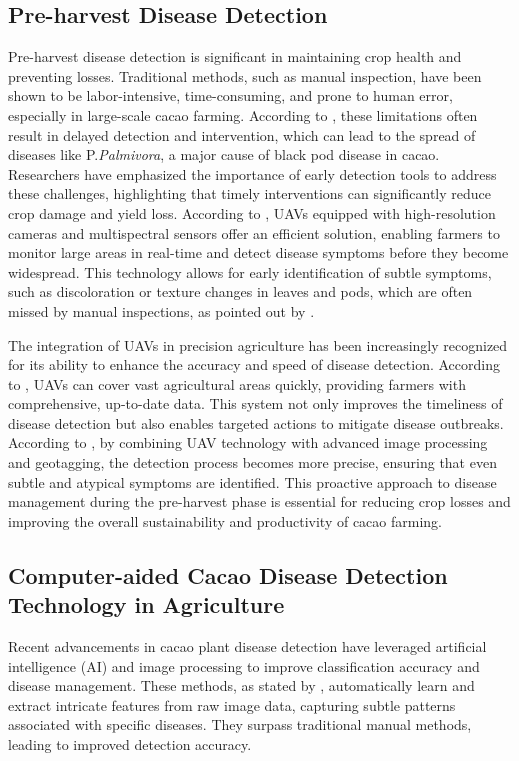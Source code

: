 \subsection*{Pre-harvest Disease Detection}
Pre-harvest disease detection is significant in maintaining crop health and preventing losses. Traditional methods, such as manual inspection, have been shown to be labor-intensive, time-consuming, and prone to human error, especially in large-scale cacao farming. According to \cite{Tan2018}, these limitations often result in delayed detection and intervention, which can lead to the spread of diseases like P.\textit{Palmivora}, a major cause of black pod disease in cacao. Researchers have emphasized the importance of early detection tools to address these challenges, highlighting that timely interventions can significantly reduce crop damage and yield loss. According to \cite{Yadav2024}, UAVs equipped with high-resolution cameras and multispectral sensors offer an efficient solution, enabling farmers to monitor large areas in real-time and detect disease symptoms before they become widespread. This technology allows for early identification of subtle symptoms, such as discoloration or texture changes in leaves and pods, which are often missed by manual inspections, as pointed out by \cite{Upadhyay2025}.

The integration of UAVs in precision agriculture has been increasingly recognized for its ability to enhance the accuracy and speed of disease detection. According to \cite{Vyas2023}, UAVs can cover vast agricultural areas quickly, providing farmers with comprehensive, up-to-date data. This system not only improves the timeliness of disease detection but also enables targeted actions to mitigate disease outbreaks. According to \cite{Taesiri2023}, by combining UAV technology with advanced image processing and geotagging, the detection process becomes more precise, ensuring that even subtle and atypical symptoms are identified. This proactive approach to disease management during the pre-harvest phase is essential for reducing crop losses and improving the overall sustainability and productivity of cacao farming.

\subsection*{Computer-aided Cacao Disease Detection Technology in Agriculture}
Recent advancements in cacao plant disease detection have leveraged artificial intelligence (AI) and image processing to improve classification accuracy and disease management. These methods, as stated by \cite{Upadhyay2025}, automatically learn and extract intricate features from raw image data, capturing subtle patterns associated with specific diseases. They surpass traditional manual methods, leading to improved detection accuracy.

